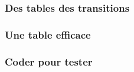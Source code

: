 \subsubsection{Des tables des transitions}

	


\subsubsection{Une table efficace} \label{better-2-and-3}

	


\subsubsection{Coder pour tester}

	
